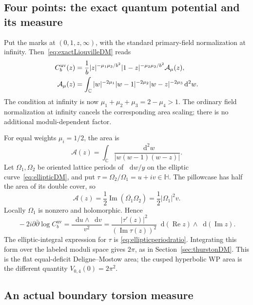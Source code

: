 \documentclass[11pt,a4paper]{article}
\numberwithin{equation}{section}
\theoremstyle{definition}
\theoremstyle{remark}
\newcommand{\dd}{\mathop{}\!\mathrm d}
\newcommand{\HH}{\mathbb H}
\newcommand{\CC}{\mathbb C}
\begin{document}
\subsection{Four points: the exact quantum potential and its measure}

Put the marks at $(0,1,z,\infty)$, with the standard primary-field
normalization at infinity. Then~\eqref{eq:exactLiouvilleDM} reads
\begin{align}
 C_b^{\mathrm{uv}}(z)
   &=\frac1b |z|^{-\mu_1\mu_3/b^2}
              |1-z|^{-\mu_2\mu_3/b^2}\mathcal A_\mu(z),
              \label{eq:fourpointLiouville}\\
 \mathcal A_\mu(z)
   &=\int_{\CC}|w|^{-2\mu_1}|w-1|^{-2\mu_2}
                         |w-z|^{-2\mu_3}\dd^2w.\notag
\end{align}
The condition at infinity is now
$\mu_1+\mu_2+\mu_3=2-\mu_4>1$. The ordinary field
normalization at infinity cancels the corresponding area scaling;
there is no additional moduli-dependent factor.

For equal weights $\mu_i=1/2$, the area is
\begin{equation}
 \mathcal A(z)=\int_{\CC}\frac{\dd^2w}{|w(w-1)(w-z)|}.
 \label{eq:fourpointareaintegral}
\end{equation}
Let $\Omega_1,\Omega_2$ be oriented lattice periods of
$\dd w/y$ on the elliptic curve~\eqref{eq:ellipticDM}, and put
$\tau=\Omega_2/\Omega_1=u+iv\in\HH$. The pillowcase has
half the area of its double cover, so
\[
 \mathcal A(z)=\frac12\operatorname{Im}
       (\overline{\Omega_1}\Omega_2)
             =\frac12|\Omega_1|^2v.
\]
Locally $\Omega_1$ is nonzero and holomorphic. Hence
\begin{equation}
 \boxed{\quad
 -2i\partial\bar\partial\log C_b^{\mathrm{uv}}
    =\frac{\dd u\wedge\dd v}{v^2}
    =\frac{|\tau'(z)|^2}{(\operatorname{Im}\tau(z))^2}
                         \dd(\operatorname{Re}z)\wedge
                         \dd(\operatorname{Im}z).
 \quad}
 \label{eq:fourpointquantumDMdensity}
\end{equation}
The elliptic-integral expression for $\tau$ is
\eqref{eq:ellipticperiodratio}. Integrating this form over the
labeled moduli space gives $2\pi$, as in
Section~\ref{sec:thurstonDM}. This is the flat equal-deficit
Deligne--Mostow area; the cusped hyperbolic WP area is the
different quantity $V_{0,4}(0)=2\pi^2$.

\subsection{An actual boundary torsion measure}
\end{document}
